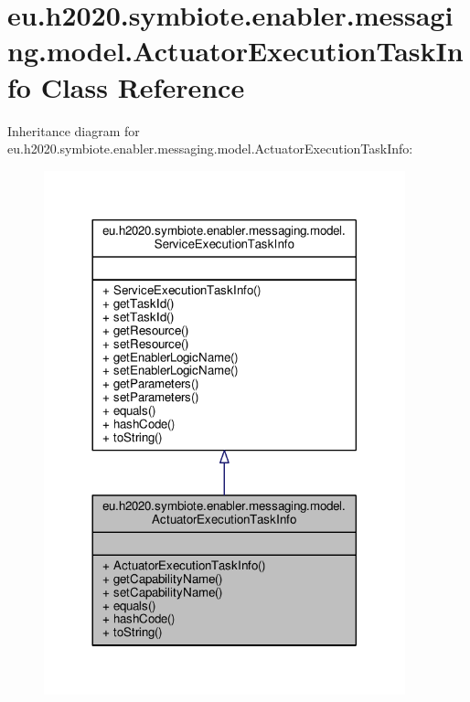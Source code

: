 \hypertarget{classeu_1_1h2020_1_1symbiote_1_1enabler_1_1messaging_1_1model_1_1ActuatorExecutionTaskInfo}{}\section{eu.\+h2020.\+symbiote.\+enabler.\+messaging.\+model.\+Actuator\+Execution\+Task\+Info Class Reference}
\label{classeu_1_1h2020_1_1symbiote_1_1enabler_1_1messaging_1_1model_1_1ActuatorExecutionTaskInfo}


Inheritance diagram for eu.\+h2020.\+symbiote.\+enabler.\+messaging.\+model.\+Actuator\+Execution\+Task\+Info\+:\nopagebreak
\begin{figure}[H]
\begin{center}
\leavevmode
\includegraphics[width=296pt]{classeu_1_1h2020_1_1symbiote_1_1enabler_1_1messaging_1_1model_1_1ActuatorExecutionTaskInfo__inherit__graph}
\end{center}
\end{figure}


